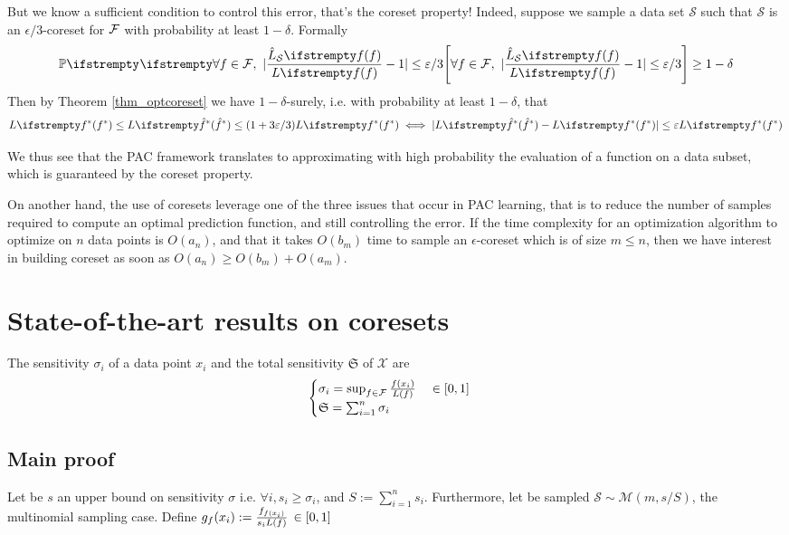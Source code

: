 But we know a sufficient condition to control this error, that's the coreset property! Indeed, suppose we sample a data set $\mathcal{S}$ such that $\mathcal{S}$ is an $\epsilon/3$-coreset for $\mathcal{F}$ with probability at least $1-\delta$. Formally
\begin{equation*}
    \PP{}{\forall f \in \qset,\ |\frac{\estloss{\mathcal{S}}{\query}}{\loss{\query}} - 1| \leq \epsilon/3} \geq 1- \delta
\end{equation*}
Then by Theorem \ref{thm_optcoreset} we have $1-\delta$-surely, i.e. with probability at least $1-\delta$, that
\begin{equation*}
    \loss{\query^*} \leq \loss{\hat\query^*} \leq (1+ 3 \epsilon/3) \loss{\query^*} \iff
    |\loss{\hat\query^*} - \loss{\query^*}| \leq \epsilon \loss{\query^*}
\end{equation*}

We thus see that the PAC framework translates to approximating with high probability the evaluation of a function on a data subset, which is guaranteed by the coreset property. 

On another hand, the use of coresets leverage one of the three issues that occur in PAC learning, that is to reduce the number of samples required to compute an optimal prediction function, and still controlling the error. If the time complexity for an optimization algorithm to optimize on $n$ data points is $O(a_n)$, and that it takes $O(b_m)$ time to sample an $\epsilon$-coreset which is of size $m \le n$, then we have interest in building coreset as soon as $O(a_n) \geq O(b_m) + O(a_m)$.







\section{State-of-the-art results on coresets}
\begin{definition}[Sensitivity]
	The sensitivity $\sigma_i$ of a data point $x_{i}$ and the total sensitivity $\mathfrak S$ of $\mathcal X$ are
	$$
	\begin{cases}
		\sigma_{i}= \sup _{f \in \mathcal{F}} \frac{{f}\left(x_{i}\right)}{L(f)} \quad \in[0,1]\\
		\mathfrak{S}=\sum_{i=1}^{n} \sigma_{i}
	\end{cases}
	$$
\end{definition} 

\subsection{Main proof}
Let be $s$ an upper bound on sensitivity $\sigma$ i.e. $\forall i, s_i \geq \sigma_i$, and $S := \sum_{i=1}^n s_i$. Furthermore, let be sampled  $\mathcal S \sim \mathcal M(m, s/S)$, the multinomial sampling case. Define $g_f(x_i) :=  \frac{f_{f(x_i)}}{s_i L(f)}  \, \in[0,1]$

